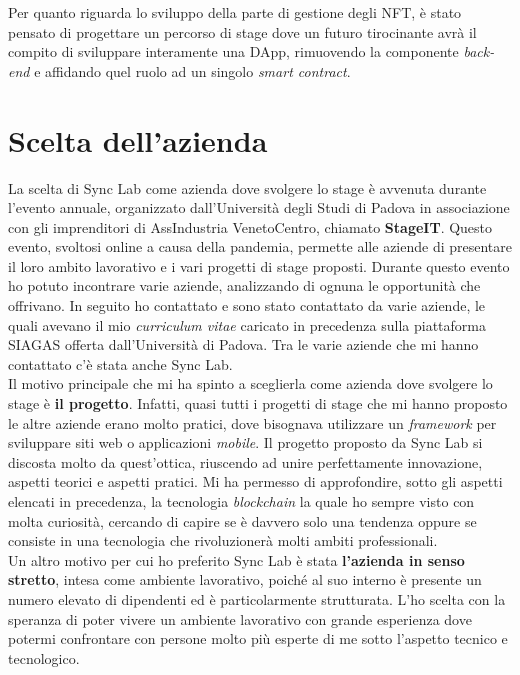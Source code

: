 Per quanto riguarda lo sviluppo della parte di gestione degli NFT, è stato pensato di progettare un percorso di stage dove un futuro tirocinante avrà il compito di sviluppare interamente una \gls{DApp}, rimuovendo la componente \textit{back-end} e affidando quel ruolo ad un singolo \textit{smart contract}.


\section{Scelta dell'azienda}
La scelta di Sync Lab come azienda dove svolgere lo stage è avvenuta durante l'evento annuale, organizzato dall'Università degli Studi di Padova in associazione con gli imprenditori di AssIndustria VenetoCentro, chiamato \textbf{StageIT}. Questo evento, svoltosi online a causa della pandemia, permette alle aziende di presentare il loro ambito lavorativo e i vari progetti di stage proposti. Durante questo evento ho potuto incontrare varie aziende, analizzando di ognuna le opportunità che offrivano. In seguito ho contattato e sono stato contattato da varie aziende, le quali avevano il mio \textit{curriculum vitae} caricato in precedenza sulla piattaforma SIAGAS offerta dall'Università di Padova. Tra le varie aziende che mi hanno contattato c'è stata anche Sync Lab. \\

Il motivo principale che mi ha spinto a sceglierla come azienda dove svolgere lo stage è \textbf{il progetto}. Infatti, quasi tutti i progetti di stage che mi hanno proposto le altre aziende erano molto pratici, dove bisognava utilizzare un \textit{framework} per sviluppare siti web o applicazioni \textit{mobile}. Il progetto proposto da Sync Lab si discosta molto da quest'ottica, riuscendo ad unire perfettamente innovazione, aspetti teorici e aspetti pratici. Mi ha permesso di approfondire, sotto gli aspetti elencati in precedenza, la tecnologia \textit{blockchain} la quale ho sempre visto con molta curiosità, cercando di capire se è davvero solo una tendenza oppure se consiste in una tecnologia che rivoluzionerà molti ambiti professionali. \\

Un altro motivo per cui ho preferito Sync Lab è stata \textbf{l'azienda in senso stretto}, intesa come ambiente lavorativo, poiché al suo interno è presente un numero elevato di dipendenti ed è particolarmente strutturata. L'ho scelta con la speranza di poter vivere un ambiente lavorativo con grande esperienza dove potermi confrontare con persone molto più esperte di me sotto l'aspetto tecnico e tecnologico.

